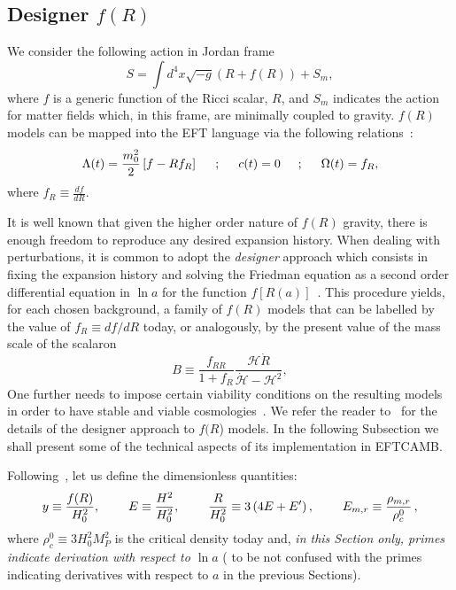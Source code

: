 \documentclass[prd,nofootinbib,showpacs]{revtex4}
\def\be{\begin{equation}}
\def\ee{\end{equation}}
\def\l{\left}
\def\r{\right}
\def\f{\frac}
\def\hub{{\mathcal H}}
\begin{document}
{\subsection{Designer $f(R)$}\label{SubSec:DesignerFR}
We consider the following action in Jordan frame
\begin{equation} 
S=\int d^4x \sqrt{-g} \l(R+f(R)\r)+S_m, 
\end{equation}
where $f$ is a generic function of the Ricci scalar, $R$, and $S_m$ indicates the action for matter fields which, in this frame, are minimally coupled to gravity.
$f(R)$ models can  be mapped into the EFT language via the following relations~\cite{Gubitosi:2012hu}:
\begin{align} \label{Eq:MatchingFR}
\Lambda(t)=\frac{m_0^2}{2}\l[f- Rf_R \r] \hspace{0.5cm};\hspace{0.5cm} c(t)=0 \hspace{0.5cm};\hspace{0.5cm} \Omega(t)=f_R,
\end{align}
where $f_R\equiv\frac{df}{dR}$. 

It is well known that  given the higher order nature of $f(R)$ gravity, there is enough freedom to reproduce any desired expansion history. When dealing with perturbations, it is common to adopt the \emph{designer} approach which consists in fixing the expansion history and solving the Friedman equation as a second order differential equation in $\ln a$ for the function $f[R(a)]$~\cite{Song:2006ej,Pogosian:2007sw}. This procedure yields, for each chosen background, a family of $f(R)$ models that can be labelled by the value of $f_R\equiv df/dR$ today, or analogously, by the present value of the mass scale of the scalaron
\be\label{B}
B\equiv\f{f_{RR}}{1+f_R}\f{\hub\dot{R}}{\dot{\hub}-\hub^2},
\ee
One further needs to impose certain viability conditions on the resulting models in order to have stable and viable cosmologies~\cite{Pogosian:2007sw}.
We refer the reader to~\cite{Song:2006ej,Pogosian:2007sw} for the details of the designer approach to $f(R$) models. In the following Subsection we shall present some of the technical aspects of its implementation in EFTCAMB.

Following~\cite{Pogosian:2007sw}, let us define the dimensionless quantities:
\begin{align}
y\equiv \frac{f(R)}{H_0^2}, \hspace{0.8cm} E \equiv \frac{H^2}{H_0^2}, \hspace{0.8cm} \frac{R}{H_0^2} \equiv 3\left(4 E +E' \right),\hspace{0.8cm}E_{m,r}\equiv\f{\rho_{m,r}}{\rho_c^0}\,,
\end{align}
where $\rho_c^0\equiv 3H_0^2M_P^2$ is the critical density today and, \emph{in this Section only, primes indicate derivation with respect to $\ln a$} ( to  be not confused with the primes indicating derivatives with respect to $a$ in the previous Sections).
 
}
\end{document}

